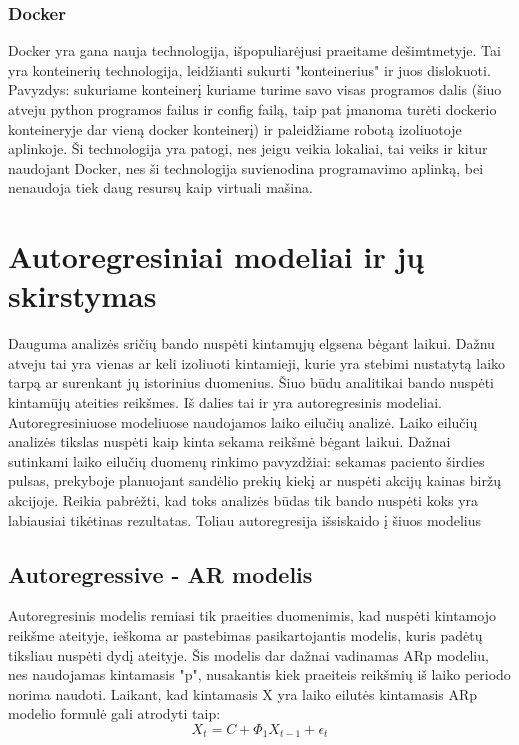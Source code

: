 \documentclass{VUMIFInfKursinis}
\begin{document}
\subsubsection{Docker}
Docker yra gana nauja technologija, išpopuliarėjusi praeitame dešimtmetyje. Tai yra konteinerių technologija, leidžianti sukurti "konteinerius" ir 
juos dislokuoti. Pavyzdys: sukuriame konteinerį kuriame turime savo visas programos dalis 
(šiuo atveju python programos failus ir config failą, taip pat įmanoma turėti
dockerio konteineryje dar vieną docker konteinerį) ir paleidžiame robotą izoliuotoje aplinkoje. 
Ši technologija yra patogi, nes jeigu veikia lokaliai, tai veiks ir kitur naudojant Docker, nes ši technologija
suvienodina programavimo aplinką, bei nenaudoja tiek daug resursų kaip virtuali mašina.

\section{Autoregresiniai modeliai ir jų skirstymas}
Dauguma analizės sričių bando nuspėti kintamųjų elgsena bėgant laikui. Dažnu atveju tai yra vienas ar keli izoliuoti kintamieji, kurie yra stebimi nustatytą laiko
tarpą ar surenkant jų istorinius duomenius. Šiuo būdu analitikai bando nuspėti kintamūjų ateities reikšmes. Iš dalies tai ir yra autoregresinis modeliai. 
Autoregresiniuose modeliuose naudojamos laiko eilučių analizė. Laiko eilučių analizės tikslas nuspėti kaip kinta sekama reikšmė bėgant laikui. Dažnai sutinkami laiko eilučių
duomenų rinkimo pavyzdžiai: sekamas paciento širdies pulsas, prekyboje planuojant sandėlio prekių kiekį ar nuspėti akcijų kainas biržų akcijoje.
Reikia pabrėžti, kad toks analizės būdas tik bando nuspėti koks yra labiausiai tikėtinas rezultatas. Toliau autoregresija išsiskaido į šiuos modelius
\subsection{Autoregressive - AR modelis}
Autoregresinis modelis remiasi tik praeities duomenimis, kad nuspėti kintamojo reikšme ateityje, ieškoma ar pastebimas pasikartojantis modelis, kuris padėtų tiksliau nuspėti dydį ateityje.
Šis modelis dar dažnai vadinamas ARp modeliu, nes naudojamas kintamasis "p", nusakantis kiek praeiteis reikšmių iš laiko periodo norima naudoti.
Laikant, kad kintamasis X yra laiko eilutės kintamasis ARp modelio formulė gali atrodyti taip: \[X_{t} = C + \Phi _{1}X_{t-1}+\epsilon_{t} \]
\end{document}
